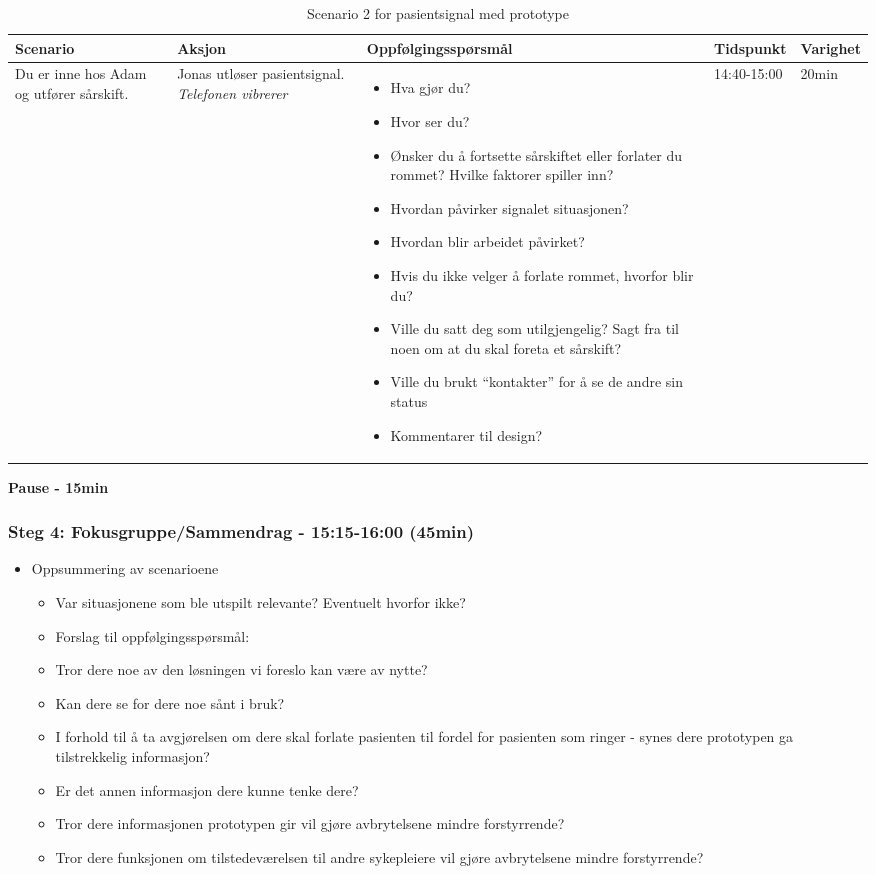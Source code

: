 \begin{table}[H]
\small
\caption{Scenario 2 for pasientsignal med prototype}
\begin{tabular}{p{3cm}|p{2cm}|p{4cm}|l|l}
\hline
\textbf{Scenario} & \textbf{Aksjon} & \textbf{Oppfølgingsspørsmål} & \textbf{Tidspunkt} & \textbf{Varighet}\\
\hline
Du er inne hos Adam og utfører sårskift. & Jonas utløser pasientsignal. \emph{Telefonen vibrerer} & \begin{itemize}
\item Hva gjør du?
\item Hvor ser du?
\item Ønsker du å fortsette sårskiftet eller forlater du rommet? Hvilke faktorer spiller inn?
\item Hvordan påvirker signalet situasjonen?
\item Hvordan blir arbeidet påvirket?
\item Hvis du ikke velger å forlate rommet, hvorfor blir du?
\item Ville du satt deg som utilgjengelig? Sagt fra til noen om at du skal foreta et sårskift?
\item Ville du brukt “kontakter” for å se de andre sin status
\item Kommentarer til design?
\end{itemize}
& 14:40-15:00 & 20min\\
\end{tabular}
\label{Steg3.4}
\end{table}

\textbf{Pause - 15min}

\pagebreak

\subsubsection{Steg 4: Fokusgruppe/Sammendrag - 15:15-16:00 (45min)}

\begin{itemize}
\item Oppsummering av scenarioene
	\begin{itemize}
	\item Var situasjonene som ble utspilt relevante? Eventuelt hvorfor ikke?
\item Forslag til oppfølgingsspørsmål:
	\item Tror dere noe av den løsningen vi foreslo kan være av nytte?
	\item Kan dere se for dere noe sånt i bruk?
	\item I forhold til å ta avgjørelsen om dere skal forlate pasienten til fordel for pasienten som ringer - synes dere prototypen ga tilstrekkelig informasjon?
		\item Er det annen informasjon dere kunne tenke dere?
	\item Tror dere informasjonen prototypen gir vil gjøre avbrytelsene mindre forstyrrende?
	\item Tror dere funksjonen om tilstedeværelsen til andre sykepleiere vil gjøre avbrytelsene mindre forstyrrende?
	\end{itemize}
\end{itemize}